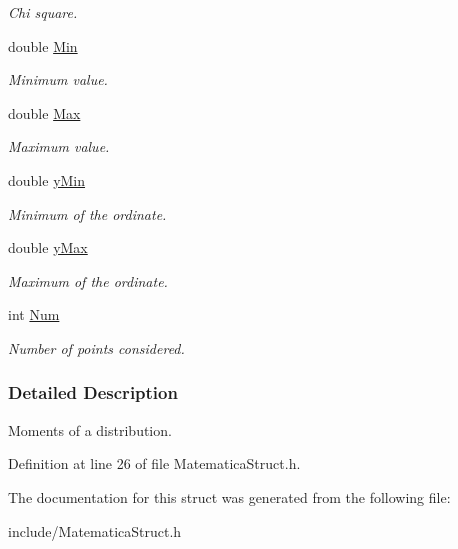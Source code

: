 \begin{DoxyCompactItemize}
\begin{DoxyCompactList}\small\item\em Chi square. \end{DoxyCompactList}\item 
double \hyperlink{structMOMENTI_a780c7f9b946188b22a9355ed414c6af9}{Min}\hypertarget{structMOMENTI_a780c7f9b946188b22a9355ed414c6af9}{}\label{structMOMENTI_a780c7f9b946188b22a9355ed414c6af9}

\begin{DoxyCompactList}\small\item\em Minimum value. \end{DoxyCompactList}\item 
double \hyperlink{structMOMENTI_a3b2b236fc7834236613c9a51e415be2e}{Max}\hypertarget{structMOMENTI_a3b2b236fc7834236613c9a51e415be2e}{}\label{structMOMENTI_a3b2b236fc7834236613c9a51e415be2e}

\begin{DoxyCompactList}\small\item\em Maximum value. \end{DoxyCompactList}\item 
double \hyperlink{structMOMENTI_a20d4c5d114c7d71b216de17d8351b407}{y\+Min}\hypertarget{structMOMENTI_a20d4c5d114c7d71b216de17d8351b407}{}\label{structMOMENTI_a20d4c5d114c7d71b216de17d8351b407}

\begin{DoxyCompactList}\small\item\em Minimum of the ordinate. \end{DoxyCompactList}\item 
double \hyperlink{structMOMENTI_a0d6c1993983b373f049cf11435200fb7}{y\+Max}\hypertarget{structMOMENTI_a0d6c1993983b373f049cf11435200fb7}{}\label{structMOMENTI_a0d6c1993983b373f049cf11435200fb7}

\begin{DoxyCompactList}\small\item\em Maximum of the ordinate. \end{DoxyCompactList}\item 
int \hyperlink{structMOMENTI_a558051bc0b213b418d65f58e4ad9a311}{Num}\hypertarget{structMOMENTI_a558051bc0b213b418d65f58e4ad9a311}{}\label{structMOMENTI_a558051bc0b213b418d65f58e4ad9a311}

\begin{DoxyCompactList}\small\item\em Number of points considered. \end{DoxyCompactList}\end{DoxyCompactItemize}


\subsubsection{Detailed Description}
Moments of a distribution. 

Definition at line 26 of file Matematica\+Struct.\+h.



The documentation for this struct was generated from the following file\+:\begin{DoxyCompactItemize}
\item 
include/Matematica\+Struct.\+h\end{DoxyCompactItemize}

